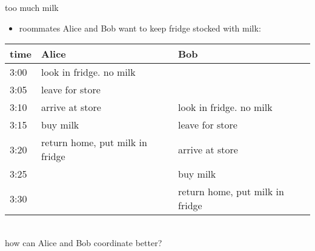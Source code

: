 \begin{frame}{too much milk}
\begin{itemize}
\item roommates Alice and Bob want to keep fridge stocked with milk:
\end{itemize}
\begin{tabular}{l|l|l}
    time & Alice & Bob \\ \hline\hline
    3:00 & look in fridge. no milk & ~\\ \hline
    3:05 & leave for store & ~\\ \hline
    3:10 & arrive at store & look in fridge. no milk \\ \hline
    3:15 & buy milk & leave for store \\ \hline
    3:20 & return home, put milk in fridge & arrive at store \\ \hline
    3:25 & ~ & buy milk \\ \hline
    3:30 & ~ & return home, put milk in fridge\\ \hline
\end{tabular}
\\
how can Alice and Bob coordinate better?
\end{frame}


